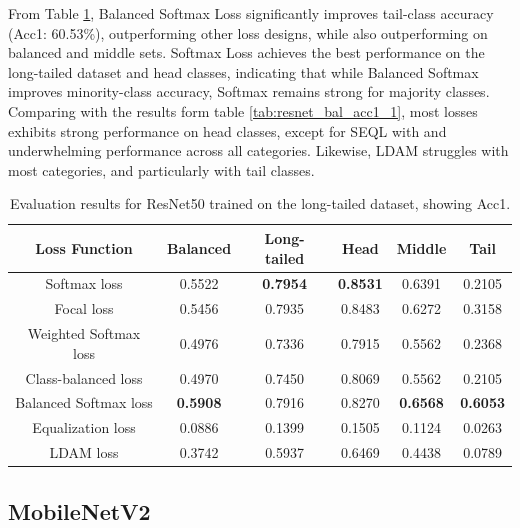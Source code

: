 From Table \ref{tab:resnet_lt_acc1_1}, Balanced Softmax Loss significantly improves tail-class accuracy (Acc1: 60.53\%), outperforming other loss designs, while also outperforming on balanced and middle sets. Softmax Loss achieves the best performance on the long-tailed dataset and head classes, indicating that while Balanced Softmax improves minority-class accuracy, Softmax remains strong for majority classes. Comparing with the results form table \ref{tab:resnet_bal_acc1_1}, most losses exhibits strong performance on head classes, except for SEQL with and underwhelming performance across all categories. Likewise, LDAM struggles with most categories, and particularly with tail classes.

\begin{table}[h!]
    \centering
    \caption{Evaluation results for ResNet50 trained on the long-tailed dataset, showing Acc1.}
    \small
    \begin{tabular}{cccccc}
        \toprule
        Loss Function & Balanced & Long-tailed & Head & Middle & Tail \\ 
        \midrule
        Softmax loss   & 0.5522 & \textbf{0.7954} & \textbf{0.8531} & 0.6391 & 0.2105 \\
        Focal loss   & 0.5456 & 0.7935 & 0.8483 & 0.6272 & 0.3158 \\
        Weighted Softmax loss   & 0.4976 & 0.7336 & 0.7915 & 0.5562 & 0.2368 \\
        Class-balanced loss   & 0.4970 & 0.7450 & 0.8069 & 0.5562 & 0.2105 \\
        Balanced Softmax loss   & \textbf{0.5908} & 0.7916 & 0.8270 & \textbf{0.6568} & \textbf{0.6053} \\
        Equalization loss   & 0.0886 & 0.1399 & 0.1505 & 0.1124 &  0.0263 \\
        LDAM loss   & 0.3742 & 0.5937 & 0.6469 & 0.4438 & 0.0789 \\
        \bottomrule
    \end{tabular}
    \label{tab:resnet_lt_acc1_1}
\end{table}


\subsection{MobileNetV2}

